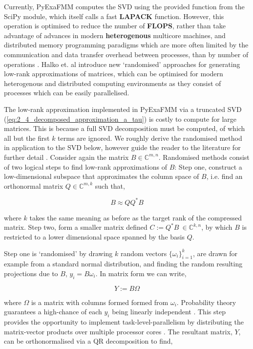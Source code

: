 Currently, \gls{PyExaFMM} computes the \gls{SVD} using the provided function
from the SciPy module, which itself calls a fast \textbf{\gls{LAPACK}}
function. However, this operation is optimised to reduce the number
of \textbf{\gls{FLOPS}}, rather than take advantage of advances in modern
\textbf{\gls{heterogenous}} multicore machines, and
distributed memory programming paradigms which are more often limited by the
communication and data transfer overhead between processes, than by number of
operations \cite{Halko:2011:SIAM}. Halko et. al introduce new `randomised'
approaches for generating low-rank approximations of matrices, which can be
optimised for modern heterogenous and distributed computing environments as they
consist of processes which can be easily parallelised.

The low-rank approximation implemented in \gls{PyExaFMM} via a truncated
\gls{SVD} (\ref{eq:2_4_decomposed_approximation_a_tau}) is costly to compute
for large matrices. This is because a full \gls{SVD} decomposition must be computed, of
which all but the first $k$ terms are ignored.
We roughly derive the randomised method in application to the \gls{SVD} below, however guide
the reader to the literature for further detail \cite{Erichson:2019:JOSS,Halko:2011:SIAM}.
Consider again the matrix $B \in \mathbb{C}^{m, n}$. Randomised methods consist
of two logical steps to find low-rank approximations of $B$: Step one, construct
a low-dimensional subspace that approximates the column space of $B$, i.e.
find an orthonormal matrix $Q \in \mathbb{C}^{m, k}$ such that,

\begin{equation}
    B \approx QQ^*B
    \label{eq:2_4_step_1_randomised}
\end{equation}

where $k$ takes the same meaning as before as the target rank of the compressed
matrix. Step two, form a smaller matrix defined $C := Q^*B \> \in \mathbb{C}^{k, n}$,
by which $B$ is restricted to a lower dimensional space spanned by the basis
$Q$.

Step one is `randomised' by drawing $k$ random vectors $\{ \omega_i \}_{i=1}^k$,
are drawn for example from a standard normal distribution, and finding the random
resulting projections due to $B$, $y_i = B \omega_i$. In matrix form we can write,

\begin{equation}
    Y := B \Omega
\end{equation}

where $\Omega$ is a matrix with columns formed formed from $\omega_i$.
Probability theory guarantees a high-chance of each $y_i$ being linearly independent
\cite{Erichson:2019:JOSS}. This step provides the opportunity to implement
\gls{task-level-parallelism} by distributing the matrix-vector products over multiple
processor cores \cite{Halko:2011:SIAM}. The resultant matrix, $Y$, can be
orthonormalised via a QR decomposition to find,

